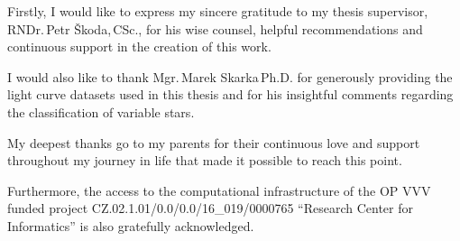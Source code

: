 \documentclass[english,bachelor,oneside]{ctufit-thesis}
\begin{document}
    \frontmatter\frontmatterinit %

    \thispagestyle{empty}\maketitle\thispagestyle{empty}\cleardoublepage %


    \imprintpage %
    \stopTOCentries

    \begin{acknowledgmentpage}

        Firstly, I would like to express my sincere gratitude to my thesis supervisor, RNDr.\,Petr Škoda,\,CSc., for his wise counsel, helpful recommendations and continuous support in the creation of this work.

        I would also like to thank Mgr.\,Marek Skarka\,Ph.D. for generously providing the light curve datasets used in this thesis and for his insightful comments regarding the classification of variable stars.

        My deepest thanks go to my parents for their continuous love and support throughout my journey in life that made it possible to reach this point.

        Furthermore, the access to the computational infrastructure of the OP VVV funded project CZ.02.1.01/0.0/0.0/16\_019/0000765 ``Research Center for Informatics'' is also gratefully acknowledged.
    \end{acknowledgmentpage}
\end{document}
